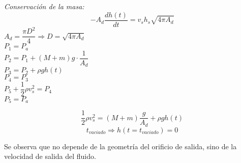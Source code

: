 \begin{enumerate}
\blue
	\textit{Conservación de la masa:}
		\[-A_d \dfrac{dh(t)}{dt} = v_s h_s \sqrt{4\pi A_d}\]
		$A_d = \dfrac{\pi D^2}{4} \Rightarrow D = \sqrt{4\pi A_d}$\\
		$P_1 = P_a$\\
		$P_2 = P_1 + (M + m)g \cdot \dfrac{1}{A_d}$\\
		$P_3 = P_2 + \rho g h(t)$\\
		$P_4 = P_3$\\
		$P_5 + \dfrac{1}{2}\rho v_s^2 = P_4$\\
		$P_5 = P_a$
		
		\[\dfrac{1}{2}\rho v_s^2 = (M + m)\dfrac{g}{A_d} + \rho g h(t)\]
		\[t_{vaciado} \Rightarrow h(t = t_{vaciado}) = 0\]
		
	Se observa que no depende de la geometría del orificio de salida, sino de la velocidad de salida del fluido.

\end{enumerate}